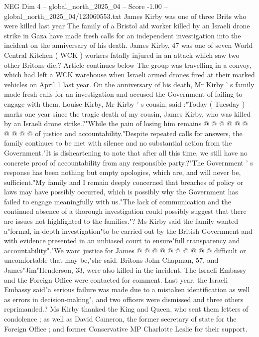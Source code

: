 \begin{textsample}{NEG Dim 4 – global\_north\_2025\_04 – Score -1.00 – global\_north\_2025\_04/123060553.txt}  \label{ex:f4_neg_241}
James Kirby was one of three Brits who were killed last year The family of a Bristol aid worker killed by an Israeli drone strike in Gaza have made fresh calls for an independent investigation into the incident on the anniversary of his death.
James Kirby, 47 was one of seven World Central Kitchen ( WCK ) workers fatally injured in an attack which saw two other Britons die.?
Article continues below The group was travelling in a convoy, which had left a WCK warehouse when Israeli armed drones fired at their marked vehicles on April 1 last year.
On the anniversary of his death, Mr Kirby ' s family made fresh calls for an investigation and accused the Government of failing to engage with them.
Louise Kirby, Mr Kirby ' s cousin, said :"Today ( Tuesday ) marks one year since the tragic death of my cousin, James Kirby, who was killed by an Israeli drone strike.?"While the pain of losing him remains @ @ @ @ @ @ @ @ @ @ of justice and accountability."Despite repeated calls for answers, the family continues to be met with silence and no substantial action from the Government."It is disheartening to note that after all this time, we still have no concrete proof of accountability from any responsible party.?"The Government ' s response has been nothing but empty apologies, which are, and will never be, sufficient."My family and I remain deeply concerned that breaches of policy or laws may have possibly occurred, which is possibly why the Government has failed to engage meaningfully with us."The lack of communication and the continued absence of a thorough investigation could possibly suggest that there are issues not highlighted to the families."?
Ms Kirby said the family wanted a"formal, in-depth investigation"to be carried out by the British Government and with evidence presented in an unbiased court to ensure"full transparency and accountability"."We want justice for James @ @ @ @ @ @ @ @ @ @ difficult or uncomfortable that may be,"she said.
Britons John Chapman, 57, and James"Jim"Henderson, 33, were also killed in the incident.
The Israeli Embassy and the Foreign Office were contacted for comment.
Last year, the Israeli Embassy said"a serious failure was made due to a mistaken identification as well as errors in decision-making", and two officers were dismissed and three others reprimanded.?
Ms Kirby thanked the King and Queen, who sent them letters of condolence ; as well as David Cameron, the former secretary of state for the Foreign Office ; and former Conservative MP Charlotte Leslie for their support.

\end{textsample}
